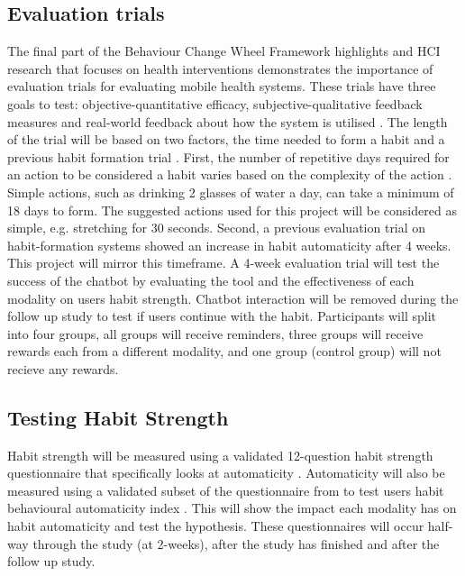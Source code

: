 \subsection{Evaluation trials}
The final part of the Behaviour Change Wheel Framework \cite{article_behaviour_change_wheel} highlights and HCI research that focuses on health interventions \cite{article_mhealth} demonstrates the importance of evaluation trials for evaluating mobile health systems. These trials have three goals to test: objective-quantitative efficacy, subjective-qualitative feedback measures and real-world feedback about how the system is utilised \cite{article_evaluate_tech_health_behaviour_change}.\newline
\newline
The length of the trial will be based on two factors, the time needed to form a habit \cite{article_how_habits_formed_modelling_habit_formation} and a previous habit formation trial \cite{article_beyond_self_tracking_designing_apps}. First, the number of repetitive days required for an action to be considered a habit varies based on the complexity of the action \cite{article_how_habits_formed_modelling_habit_formation}. Simple actions, such as drinking 2 glasses of water a day, can take a minimum of 18 days to form. The suggested actions used for this project will be considered as simple, e.g. stretching for 30 seconds. Second, a previous evaluation trial on habit-formation systems \cite{article_how_habits_formed_modelling_habit_formation} showed an increase in habit automaticity after 4 weeks. This project will mirror this timeframe.\newline
\newline
A 4-week evaluation trial will test the success of the chatbot by evaluating the tool and the effectiveness of each modality on users habit strength. Chatbot interaction will be removed during the follow up study to test if users continue with the habit. Participants will split into four groups, all groups will receive reminders, three groups will receive rewards each from a different modality, and one group (control group) will not recieve any rewards.

\subsection{Testing Habit Strength}
Habit strength will be measured using a validated 12-question habit strength questionnaire that specifically looks at automaticity \cite{article_habit_strength}. Automaticity will also be measured using a validated subset of the questionnaire from \cite{article_habit_strength} to test users habit behavioural automaticity index \cite{article_habit_measurement}. This will show the impact each modality has on habit automaticity and test the hypothesis. These questionnaires \cite{article_habit_strength, article_habit_measurement} will occur half-way through the study (at 2-weeks), after the study has finished and after the follow up study.
